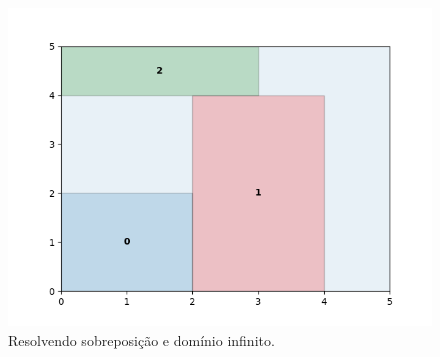 \begin{figure}[H]
    \centering
    \includegraphics[scale=0.5]{utils/images/continuous_example3}
    \caption{Resolvendo sobreposição e domínio infinito.}
    \label{fig:sobreposicao-dominio3}
\end{figure}
